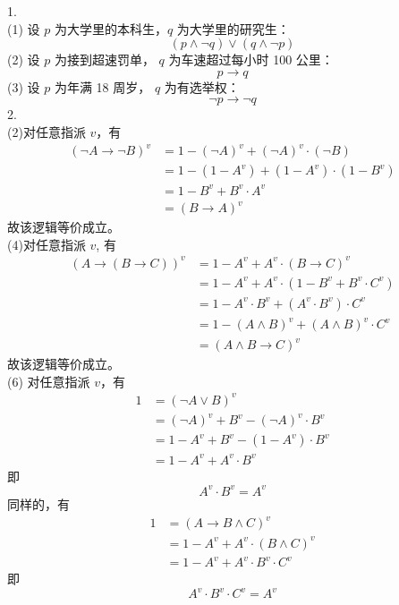 \documentclass{article}
\begin{document}
1.\\
(1) 设 $p$ 为大学里的本科生，$q$ 为大学里的研究生：
\[ (p \wedge \neg q) \vee (q \wedge \neg p) \]
(2) 设 $p$ 为接到超速罚单， $q$ 为车速超过每小时 100 公里：
\[ p \to q\]
(3) 设 $p$ 为年满 18 周岁， $q$ 为有选举权：
\[
\neg p \to \neg q 
\]
2.\\
(2)对任意指派 $v$，有
\[
\begin{aligned}
    (\neg A \to \neg B)^v & = 1 - (\neg A)^v + (\neg A)^v \cdot (\neg B) \\
                          & = 1 - (1 - A^v) + (1 - A^v) \cdot (1 - B^v) \\
                          & = 1 - B^v + B^v \cdot A^v \\
                          & = (B \to A)^v
\end{aligned}    
\]
故该逻辑等价成立。\\
(4)对任意指派 $v$, 有
\[
\begin{aligned}
    (A \to (B \to C))^v & = 1 - A^v + A^v \cdot (B \to C)^v \\
                        & = 1 - A^v + A^v \cdot (1 - B^v + B^v \cdot C^v) \\
                        & = 1 - A^v \cdot B^v + (A^v \cdot B^v) \cdot C^v \\
                        & = 1 - (A \wedge B)^v + (A \wedge B)^v \cdot C^v \\
                        & = (A \wedge B \to C)^v
\end{aligned}
\]
故该逻辑等价成立。\\
(6) 对任意指派 $v$，有
\[
\begin{aligned}
    1 & = (\neg A \vee B)^v \\
      & = (\neg A)^v + B^v - (\neg A)^v \cdot B^v \\
      & = 1 - A^v + B^v -  (1 - A^v) \cdot B^v \\
      & = 1 -  A^v + A^v \cdot B^v
\end{aligned}
\]
即
\begin{equation}
    A^v \cdot B^v = A^v 
\end{equation}
同样的，有
\[
\begin{aligned}
    1 & = (A \to B \wedge C)^v \\
      & = 1 - A^v + A^v \cdot (B \wedge C)^v \\
      & = 1 - A^v + A^v \cdot B^v \cdot C^v 
\end{aligned}
\]
即
\begin{equation}
    A^v \cdot B^v \cdot C^v = A^v
\end{equation}
\end{document}
